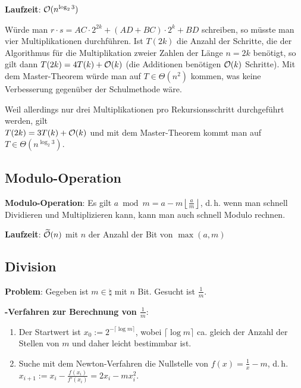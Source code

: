 \textbf{Laufzeit}:
$\mathcal{O}(n^{\log_2 3})$

\begin{Beweis}
    Würde man $r \cdot s = AC \cdot 2^{2k} + (AD + BC) \cdot 2^k + BD$ schreiben,
    so müsste man vier Multiplikationen durchführen.
    Ist $T(2k)$ die Anzahl der Schritte, die der Algorithmus für die Multiplikation zweier
    Zahlen der Länge $n = 2k$ benötigt, so gilt dann
    $T(2k) = 4T(k) + \mathcal{O}(k)$
    (die Additionen benötigen $\mathcal{O}(k)$ Schritte).
    Mit dem Master-Theorem würde man auf $T \in \Theta(n^2)$ kommen, was keine Verbesserung
    gegenüber der Schulmethode wäre.

    Weil allerdings nur drei Multiplikationen pro Rekursionsschritt durchgeführt werden, gilt\\
    $T(2k) = 3T(k) + \mathcal{O}(k)$ und mit dem Master-Theorem kommt man auf
    $T \in \Theta(n^{\log_2 3})$.
\end{Beweis}

\subsection{%
    Modulo-Operation%
}

\textbf{Modulo-Operation}:
Es gilt $a \bmod m = a - m \left\lfloor\frac{a}{m}\right\rfloor$,
d.\,h. wenn man schnell Dividieren und Multiplizieren kann, kann man auch schnell Modulo rechnen.

\textbf{Laufzeit}:
$\widetilde{\mathcal{O}}(n)$ mit $n$ der Anzahl der Bit von $\max(a, m)$

\pagebreak

\subsection{%
    Division%
}

\textbf{Problem}:
Gegeben ist $m \in \natural$ mit $n$ Bit.
Gesucht ist $\frac{1}{m}$.

\textbf{-Verfahren zur Berechnung von $\frac{1}{m}$}:
\begin{enumerate}
    \item
    Der Startwert ist $x_0 := 2^{-\lceil\log m \rceil}$,
    wobei $\lceil\log m \rceil$ ca. gleich der Anzahl der Stellen von $m$ und
    daher leicht bestimmbar ist.

    \item
    Suche mit dem Newton-Verfahren die Nullstelle von $f(x) = \frac{1}{x} - m$, d.\,h.\\
    $x_{i+1} := x_i - \frac{f(x_i)}{f'(x_i)} = 2x_i - mx_i^2$.
\end{enumerate}

